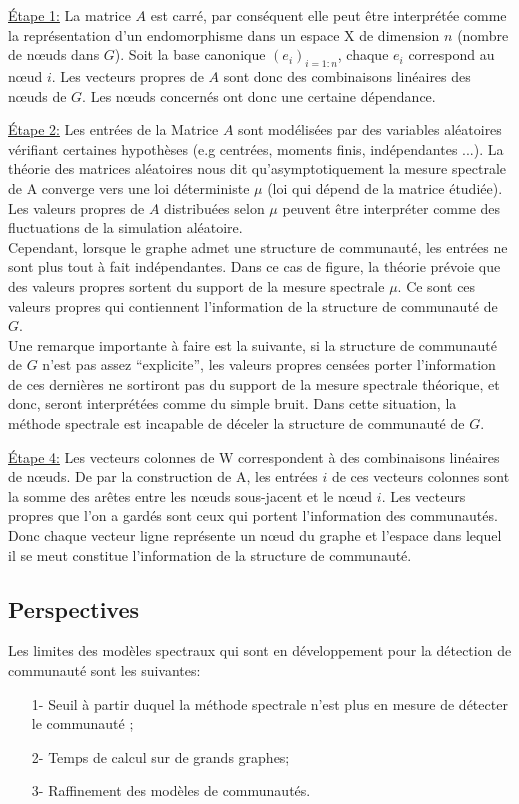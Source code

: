 \par{\underline{Étape 1:}}
La matrice $A$ est carré, par conséquent elle peut être interprétée comme la représentation d'un endomorphisme dans un espace X de dimension $n$ (nombre de nœuds dans $G$).
Soit la base canonique $(e_i)_{i=1:n}$, chaque $e_i$ correspond au nœud $i$.
Les vecteurs propres de $A$ sont donc des combinaisons linéaires des nœuds de $G$.
Les nœuds concernés ont donc une certaine dépendance.
\par{\underline{Étape 2:}}
Les entrées de la Matrice $A$ sont modélisées par des variables aléatoires vérifiant certaines hypothèses (e.g centrées, moments finis, indépendantes ...).
La théorie des matrices aléatoires nous dit qu’asymptotiquement la mesure spectrale de A converge vers une loi déterministe $\mu$ (loi qui dépend de la matrice étudiée).
Les valeurs propres de $A$ distribuées selon $\mu$ peuvent être interpréter comme des fluctuations de la simulation aléatoire.\\
Cependant, lorsque le graphe admet une structure de communauté, les entrées ne sont plus tout à fait indépendantes.
Dans ce cas de figure, la théorie prévoie que des valeurs propres sortent du support de la mesure spectrale $\mu$.
Ce sont ces valeurs propres qui contiennent l'information de la structure de communauté de $G$.\\
Une remarque importante à faire est la suivante, si la structure de communauté de $G$ n'est pas assez ``explicite'', les valeurs propres censées porter l'information de ces dernières ne sortiront pas du support de la mesure spectrale théorique, et donc, seront interprétées comme du simple bruit.
Dans cette situation, la méthode spectrale est incapable de déceler la structure de communauté de $G$.
\par{\underline{Étape 4:}}
Les vecteurs colonnes de W correspondent à des combinaisons linéaires de nœuds.
De par la construction de A, les entrées $i$ de ces vecteurs colonnes sont la somme des arêtes entre les nœuds sous-jacent et le nœud $i$.
Les vecteurs propres que l'on a gardés sont ceux qui portent l'information des communautés.
Donc chaque vecteur ligne représente un nœud du graphe et l'espace dans lequel il se meut constitue l'information de la structure de communauté. 

\subsection{Perspectives}
Les limites des modèles spectraux qui sont en développement pour la détection de communauté sont les suivantes:
\begin{itemize}
	\item[1-] Seuil à partir duquel la méthode spectrale n'est plus en mesure de détecter le communauté ;  
	\item[2-] Temps de calcul sur de grands graphes;  
	\item[3-] Raffinement des modèles de communautés.  
\end{itemize}

